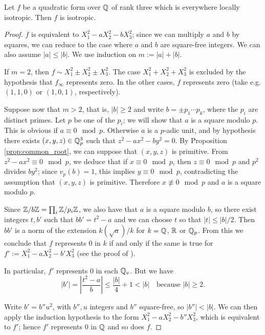 \begin{lemma}\label{lem:isotr_of_rk_three}
	\leanok
	Let $f$ be a quadratic form over $\mathbb{Q}$ of rank three which is everywhere locally isotropic. Then $f$ is isotropic.
\end{lemma}
\begin{proof}
$f$ is equivalent to $X_1^2 - a X_2^2 - b X_3^2$; since we can multiply $a$ and $b$ by squares, we can reduce to the case where $a$ and $b$ are square-free integers. We can also assume $|a| \le |b|$. We use induction on $m := |a| + |b|$.

If $m = 2$, then $f \sim X_1^2 \pm X_2^2 \pm X_3^2$. The case $X_1^2 + X_2^2 + X_3^2$ is excluded by the hypothesis that $f_\infty$ represents zero. In the other cases, $f$ represents zero (take e.g. $(1, 1, 0)$ or $(1, 0, 1)$, respectively).

Suppose now that $m > 2$, that is, $|b| \ge 2$ and write $b = \pm p_1 \cdots p_k$, where the $p_i$ are distinct primes. Let $p$ be one of the $p_i$; we will show that $a$ is a square modulo $p$. This is obvious if $a \equiv 0 \mod p$. Otherwise $a$ is a $p$-adic unit, and by hypothesis there exists $(x, y, z) \in \mathbb{Q}_p^3$ such that $z^2 - ax^2 - by^2 = 0$. By Proposition \ref{prop:common_root}, we can suppose that $(x, y, z)$ is primitive.
From $z^2 - a x^2 \equiv 0 \mod p$, we deduce that if $x \equiv 0 \mod p$, then $z \equiv 0 \mod p$ and $p^2$ divides $by^2$; since $v_p(b) = 1$, this implies $y \equiv 0 \mod p$, contradicting the assumption that $(x, y, z)$ is primitive. Therefore $x \not\equiv 0 \mod p$ and $a$ is a square modulo $p$.

Since $\mathbb{Z} / b\mathbb{Z} = \prod_i \mathbb{Z} / p_i \mathbb{Z}$, we also have that $a$ is a square modulo $b$, so there exist integers $t, b'$ such that $bb' = t^2 - a$ and we can choose $t$ so that $|t| \le |b|/2$. Then $bb'$ is a norm of the extension $k(\sqrt{a})/k$ for $k = \mathbb{Q}$, $\mathbb{R}$ or $\mathbb{Q}_p$. From this we conclude that $f$ represents $0$ in $k$ if and only if the same is true for $f' := X_1^2 - a X_2^2 - b' X_3^2$ (see the proof of \cite[\S III.1.1, Proposition 1]{Ser73}).

In particular, $f'$ represents $0$ in each $\mathbb{Q}_v$. But we have
\[ |b'| = \left | \frac{t^2 - a}{b} \right | \le \frac{|b|}{4} + 1 < |b| \quad \text{because } |b| \ge 2.  \]

Write $b' = b'' u^2$, with $b'', u$ integers and $b''$ square-free, so $|b''| < |b|$. We can then apply the induction hypothesis to the form $X_1^2 - a X_2^2 - b'' X_3^2$, which is equivalent to $f'$; hence $f'$ represents $0$ in $\mathbb{Q}$ and so does $f$.
\end{proof}

